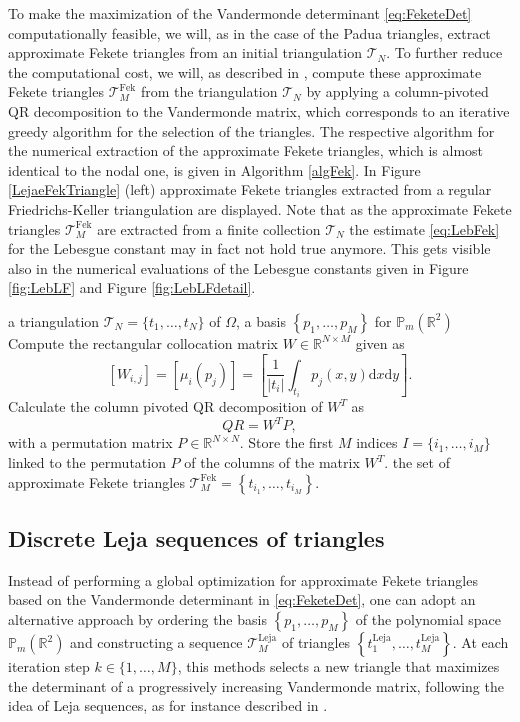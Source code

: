 \documentclass{svjour3}
\newcommand{\de}{\mathrm{d}}
\newcommand{\T}{\mathcal{T}}
\renewcommand{\P}{\mathbb{P}} %
\renewcommand{\de}{\mathrm{d}} %
\begin{document}
To make the maximization of the Vandermonde determinant \eqref{eq:FeketeDet} computationally feasible, we will, as in the case of the Padua triangles, extract approximate Fekete triangles from an initial triangulation $\T_N$. To further reduce the computational cost, we will, as described in \cite{BSV12}, compute these approximate Fekete triangles $\mathcal{T}_M^{\mathrm{Fek}}$ from the triangulation $\T_N$ by applying a column-pivoted QR decomposition to the Vandermonde matrix, which corresponds to an iterative greedy algorithm for the selection of the triangles. The respective algorithm for the numerical extraction of the approximate Fekete triangles, which is almost identical to the nodal one, is given in Algorithm \ref{algFek}. In Figure \ref{LejaeFekTriangle} (left) approximate Fekete triangles extracted from a regular Friedrichs-Keller triangulation are displayed. Note that as the approximate Fekete triangles $\mathcal{T}_M^{\mathrm{Fek}}$ are extracted from a finite collection $\mathcal{T}_N$ the estimate \eqref{eq:LebFek} for the Lebesgue constant may in fact not hold true anymore. This gets visible also in the numerical evaluations of the Lebesgue constants given in Figure \ref{fig:LebLF} and Figure \ref{fig:LebLFdetail}. 

\begin{algorithm}[h!]
	\caption{Extraction of approximate Fekete triangles}
	\begin{algorithmic}[1]
		\Require a triangulation $\mathcal{T}_N= \{t_1,\dots,t_N\}$ of $ \Omega $, a basis $ \left\{p_1, \dots,p_M \right\}$ for $ \P_m \left(\mathbb{R}^2\right) $
		\State Compute the rectangular collocation matrix $ W \in \mathbb{R}^{N \times M}$ given as
        \[ [W_{i,j}] = \left[ \mu_i(p_j)\right] = \left[ \frac{1}{|t_i|} \int_{t_i} p_j(x,y) \de x \de y \right].\]
		\State Calculate the column pivoted QR decomposition of $W^T$ as 
        \[Q R = W^T P, \]
        with a permutation matrix $P \in \mathbb{R}^{N \times N}$. 
        \State Store the first $M$ indices $I = \{i_1, \ldots, i_M\}$ linked to the permutation $P$ of the columns of the matrix $W^T$. 
        \Ensure the set of approximate Fekete triangles $\mathcal{T}^{\mathrm{Fek}}_M= \left\{ t_{i_1},\dots,t_{i_M} \right\}$. 
	\end{algorithmic}
	\label{algFek}
\end{algorithm}

\subsection{Discrete Leja sequences of triangles}
 Instead of performing a global optimization for approximate Fekete triangles based on the Vandermonde determinant in \eqref{eq:FeketeDet}, one can adopt an alternative approach by ordering the basis $ \left\{ p_1, \ldots, p_M \right\} $ of the polynomial space $ \P_m\left(\mathbb{R}^2\right) $ and constructing a sequence $ \mathcal{T}_M^{\mathrm{Leja}} $ of triangles $ \left\{t_1^{\mathrm{Leja}}, \ldots, t_M^{\mathrm{Leja}}\right\} $. At each iteration step $ k \in \{1, \ldots, M\} $, this methods selects a new triangle that maximizes the determinant of a progressively increasing Vandermonde matrix, following the idea of Leja sequences, as for instance described in \cite{DeMarchiLeja}. 
 
\end{document}

